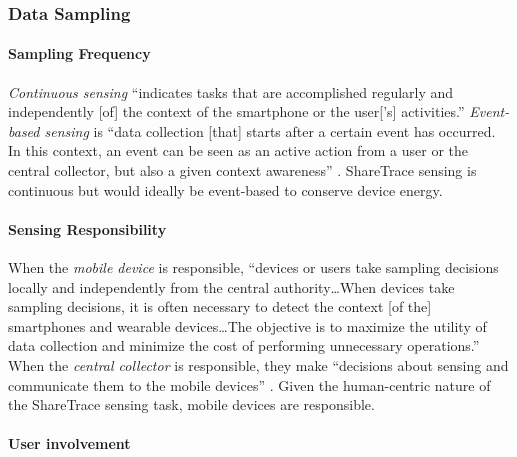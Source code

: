\subsubsection{Data Sampling}

\paragraph{Sampling Frequency}

\emph{Continuous sensing} ``indicates tasks that are accomplished regularly and independently [of] the context of the smartphone or the user['s] activities.'' \emph{Event-based sensing} is ``data collection [that] starts after a certain event has occurred. In this context, an event can be seen as an active action from a user or the central collector, but also a given context awareness'' \citep{Capponi2019}. ShareTrace sensing is continuous but would ideally be event-based to conserve device energy.

\paragraph{Sensing Responsibility}

When the \emph{mobile device} is responsible, ``devices or users take sampling decisions locally and independently from the central authority{\ldots}When devices take sampling decisions, it is often necessary to detect the context [of the] smartphones and wearable devices{\ldots}The objective is to maximize the utility of data collection and minimize the cost of performing unnecessary operations.'' When the \emph{central collector} is responsible, they make ``decisions about sensing and communicate them to the mobile devices'' \citep{Capponi2019}. Given the human-centric nature of the ShareTrace sensing task, mobile devices are responsible.

\paragraph{User involvement}

